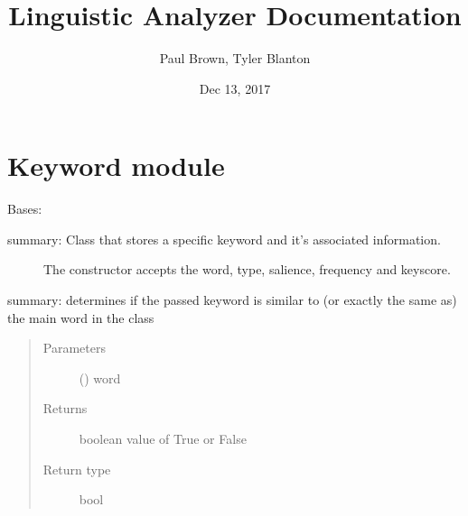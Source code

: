 \documentclass[letterpaper,10pt,english]{sphinxmanual}
\title{Linguistic Analyzer Documentation}
\date{Dec 13, 2017}
\author{Paul Brown, Tyler Blanton}
\begin{document}
\maketitle
\sphinxtableofcontents
{}\label{\detokenize{index::doc}}



\chapter{Keyword module}
\label{\detokenize{Keyword::doc}}\label{\detokenize{Keyword:welcome-to-linguistic-analyzer-s-documentation}}\label{\detokenize{Keyword:keyword-module}}\label{\detokenize{Keyword:module-Keyword}}

\begin{fulllineitems}
\label{\detokenize{Keyword:Keyword.Keyword}}
Bases: 
\begin{description}
\item[{summary: Class that stores a specific keyword and it’s associated information.}] \leavevmode
The constructor accepts the word, type, salience, frequency and keyscore.

\end{description}

\begin{fulllineitems}
\label{\detokenize{Keyword:Keyword.Keyword.issimilar}}
summary: determines if the passed keyword is similar to (or exactly the same as) the main word in the class
\begin{quote}\begin{description}
\item[{Parameters}] \leavevmode
{} () \textendash{} word

\item[{Returns}] \leavevmode
boolean value of True or False

\item[{Return type}] \leavevmode
bool

\end{description}\end{quote}


\end{fulllineitems}
\end{fulllineitems}
\end{document}
